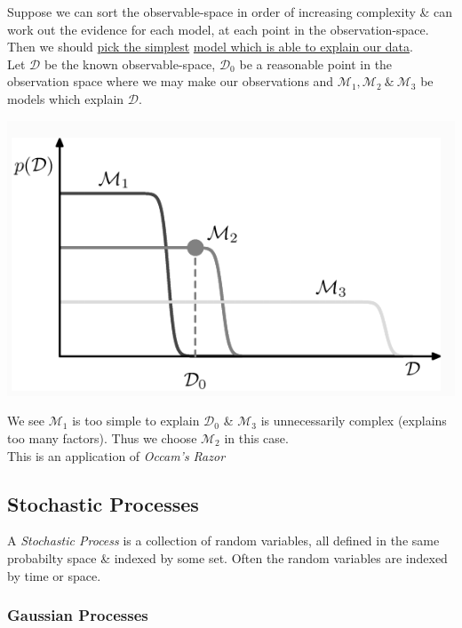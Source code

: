 \documentclass[11pt,a4paper]{article}
\begin{document}
Suppose we can sort the observable-space in order of increasing complexity \& can work out the evidence for each model, at each point in the observation-space. Then we should \underline{pick the simplest} \underline{model which is able to explain our data}.\\
Let $\mathcal{D}$ be the known observable-space, $\mathcal{D}_0$ be a reasonable point in the observation space where we may make our observations and $\mathcal{M}_1,\mathcal{M}_2\ \&\ \mathcal{M}_3$ be models which explain $\mathcal{D}$.
\begin{center}\includegraphics[scale=.5]{img/mackay.png}\end{center}
We see $\mathcal{M}_1$ is too simple to explain $\mathcal{D}_0$ \& $\mathcal{M}_3$ is unnecessarily complex (\ie explains too many factors). Thus we choose $\mathcal{M}_2$ in this case.\\
\nb This is an application of \textit{Occam's Razor}

\subsection{Stochastic Processes}

A \textit{Stochastic Process} is a collection of random variables, all defined in the same probabilty space \& indexed by some set. Often the random variables are indexed by time or space.

\subsubsection{Gaussian Processes}
\end{document}
